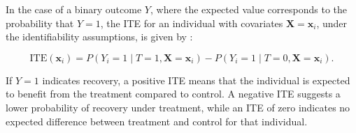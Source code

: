 % 
% 
% 
% 
% 
% 
% 
% 

\medskip

In the case of a binary outcome $Y$, where the expected value corresponds to the probability that $Y = 1$, the ITE for an individual with covariates $\mathbf{X} = \mathbf{x}_i$, under the identifiability assumptions, is given by \citep{hoogland2021}:

\medskip

\begin{equation}
\text{ITE}(\mathbf{x}_i) = P(Y_i = 1 \mid T = 1, \mathbf{X} = \mathbf{x}_i) - P(Y_i = 1 \mid T = 0, \mathbf{X} = \mathbf{x}_i).
\label{eq:ITE_binary}
\end{equation}

\medskip

If $Y = 1$ indicates recovery, a positive ITE means that the individual is expected to benefit from the treatment compared to control. A negative ITE suggests a lower probability of recovery under treatment, while an ITE of zero indicates no expected difference between treatment and control for that individual.



\medskip




